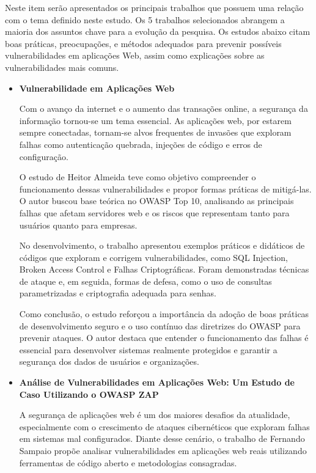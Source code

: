 \documentclass[12pt]{article}
\begin{document}
Neste item serão apresentados os principais trabalhos que possuem uma relação com o tema definido neste estudo. Os 5 trabalhos selecionados abrangem a maioria dos assuntos
 chave para a evolução da pesquisa.
Os estudos abaixo citam boas práticas, preocupações, e métodos adequados para prevenir possíveis vulnerabilidades em aplicações Web, 
assim como explicações sobre as vulnerabilidades mais comuns.
\begin{itemize}
     \item \textbf{Vulnerabilidade em Aplicações Web \cite{almeida}}
     
Com o avanço da internet e o aumento das transações online, a segurança da informação tornou-se um tema essencial. As aplicações web, por estarem sempre conectadas,
 tornam-se alvos frequentes de invasões que exploram falhas como autenticação quebrada, injeções de código e erros de configuração.

O estudo de Heitor Almeida teve como objetivo compreender o funcionamento dessas vulnerabilidades e propor formas práticas de mitigá-las. 
O autor buscou base teórica no OWASP Top 10, analisando as principais falhas que afetam servidores web e os riscos que representam tanto para usuários quanto para empresas.

No desenvolvimento, o trabalho apresentou exemplos práticos e didáticos de códigos que exploram e corrigem vulnerabilidades, como SQL Injection, 
Broken Access Control e Falhas Criptográficas. Foram demonstradas técnicas de ataque e, em seguida, formas de defesa, como o uso de consultas parametrizadas 
e criptografia adequada para senhas.

Como conclusão, o estudo reforçou a importância da adoção de boas práticas de desenvolvimento seguro e o uso contínuo das diretrizes do OWASP para prevenir ataques. 
O autor destaca que entender o funcionamento das falhas é essencial para desenvolver sistemas realmente protegidos e garantir a segurança dos dados de usuários e organizações.
        
    \item \textbf{Análise de Vulnerabilidades em Aplicações Web: Um Estudo de Caso Utilizando o OWASP ZAP \cite{sampaio2021}}
    
A segurança de aplicações web é um dos maiores desafios da atualidade, especialmente com o crescimento de ataques cibernéticos que exploram falhas em sistemas mal configurados. 
Diante desse cenário, o trabalho de Fernando Sampaio propõe analisar vulnerabilidades em aplicações web reais utilizando ferramentas de código aberto e metodologias consagradas.


\end{itemize}
\end{document}
